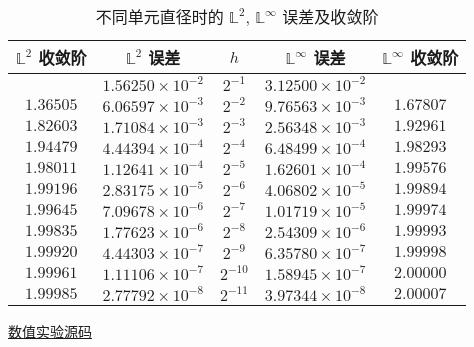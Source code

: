 \documentclass[UTF8, a4paper, 12pt, oneside, onecolumn]{article}
\begin{document}
\begin{table}[H]\centering\heiti{}
	\caption{不同单元直径时的 $\mathbb{L}^2$, $\mathbb{L}^\infty$ 误差及收敛阶}\label{tab:errorNorm}
	\begin{tabular}{|c|c|c|c|c|}\hline
		$\mathbb{L}^2$ 收敛阶	&	$\mathbb{L}^2$ 误差	&	$h$	&	$\mathbb{L}^\infty$ 误差		&	$\mathbb{L}^\infty$ 收敛阶\\\hline
					&	$1.56250 \times 10^{-2}$	&	$2^{-1}$	&	$3.12500 \times 10^{-2}$	&\\\hline
		$1.36505$	&	$6.06597 \times 10^{-3}$	&	$2^{-2}$	&	$9.76563 \times 10^{-3}$	&	$1.67807$\\\hline
		$1.82603$	&	$1.71084 \times 10^{-3}$	&	$2^{-3}$	&	$2.56348 \times 10^{-3}$	&	$1.92961$\\\hline
		$1.94479$	&	$4.44394 \times 10^{-4}$	&	$2^{-4}$	&	$6.48499 \times 10^{-4}$	&	$1.98293$\\\hline
		$1.98011$	&	$1.12641 \times 10^{-4}$	&	$2^{-5}$	&	$1.62601 \times 10^{-4}$	&	$1.99576$\\\hline
		$1.99196$	&	$2.83175 \times 10^{-5}$	&	$2^{-6}$	&	$4.06802 \times 10^{-5}$	&	$1.99894$\\\hline
		$1.99645$	&	$7.09678 \times 10^{-6}$	&	$2^{-7}$	&	$1.01719 \times 10^{-5}$	&	$1.99974$\\\hline
		$1.99835$	&	$1.77623 \times 10^{-6}$	&	$2^{-8}$	&	$2.54309 \times 10^{-6}$	&	$1.99993$\\\hline
		$1.99920$	&	$4.44303 \times 10^{-7}$	&	$2^{-9}$	&	$6.35780 \times 10^{-7}$	&	$1.99998$\\\hline
		$1.99961$	&	$1.11106 \times 10^{-7}$	&	$2^{-10}$	&	$1.58945 \times 10^{-7}$	&	$2.00000$\\\hline
		$1.99985$	&	$2.77792 \times 10^{-8}$	&	$2^{-11}$	&	$3.97344 \times 10^{-8}$	&	$2.00007$\\\hline
	\end{tabular}
\end{table}



\begin{appendices}

\href{https://github.com/Quejiahao/NumericalSolutionOfPartialDifferentialEquations.jl}{数值实验源码}

\end{appendices}
\end{document}
